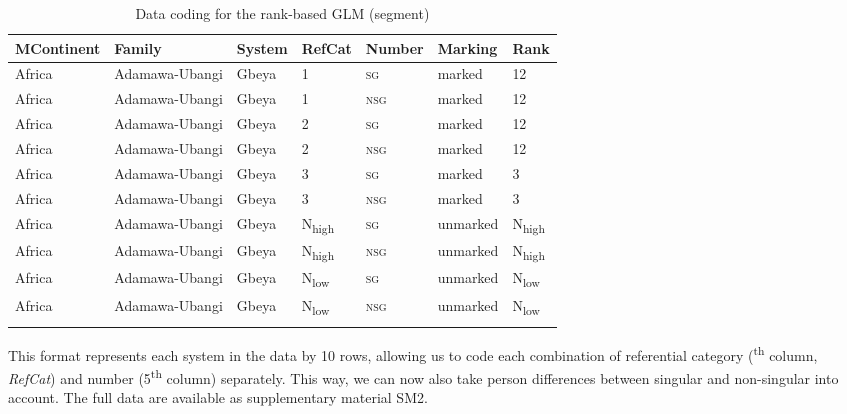 \documentclass[output=paper]{langscibook}
\begin{document}
\begin{table}
\caption{Data coding for the rank-based GLM (segment)}
\label{18-sc-tab:13}
{\small \begin{tabularx}{\textwidth}{lllllll}
\lsptoprule
\bfseries MContinent & \bfseries Family & \bfseries System & \bfseries RefCat & \bfseries Number & \bfseries Marking & \bfseries Rank\\
\midrule
Africa & Adamawa-Ubangi & Gbeya & 1 & \textsc{sg} & marked & 12\\
Africa & Adamawa-Ubangi & Gbeya & 1 & \textsc{nsg} & marked & 12\\
Africa & Adamawa-Ubangi & Gbeya & 2 & \textsc{sg} & marked & 12\\
Africa & Adamawa-Ubangi & Gbeya & 2 & \textsc{nsg} & marked & 12\\
Africa & Adamawa-Ubangi & Gbeya & 3 & \textsc{sg} & marked & 3\\
Africa & Adamawa-Ubangi & Gbeya & 3 & \textsc{nsg} & marked & 3\\
Africa & Adamawa-Ubangi & Gbeya & N\textsubscript{high} & \textsc{sg} & unmarked & N\textsubscript{high}\\
Africa & Adamawa-Ubangi & Gbeya & N\textsubscript{high} & \textsc{nsg} & unmarked & N\textsubscript{high}\\
Africa & Adamawa-Ubangi & Gbeya & N\textsubscript{low} & \textsc{sg} & unmarked & N\textsubscript{low}\\
Africa & Adamawa-Ubangi & Gbeya & N\textsubscript{low} & \textsc{nsg} & unmarked & N\textsubscript{low}\\
\lspbottomrule
\end{tabularx}}
\end{table}
\clearpage
  
This format represents each system in the data by 10 rows, allowing us to code each combination of referential category (\textsuperscript{th} column, \textit{RefCat}) and number (5\textsuperscript{th} column) separately. This way, we can now also take person differences between singular and non-singular into account. The full data are available as supplementary material SM2.
\end{document}
